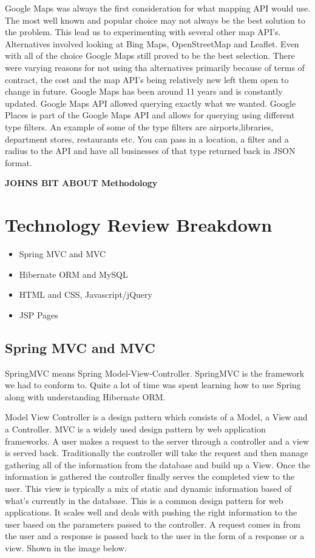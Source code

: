 Google Maps was always the first consideration for what mapping API would use. The most well known and popular choice may not always be the best solution to the problem. This lead us to experimenting with several other map API's. Alternatives involved looking at Bing Maps, OpenStreetMap and Leaflet. Even with all of the choice Google Maps still proved to be the best selection. There were varying reasons for not using tha alternatives primarily because of terms of contract, the cost and the map API's being relatively new left them open to change in future. Google Maps has been around 11 years and is constantly updated. Google Maps API allowed querying exactly what we wanted. Google Places is part of the Google Maps API and allows for querying using different type filters. An example of some of the type filters are airports,libraries, department stores, restaurants etc. You can pass in a location, a filter and a radius to the API and have all businesses of that type returned back in JSON format. \newline

\textbf{JOHNS BIT ABOUT Methodology}

\chapter{Technology Review Breakdown}

\begin{itemize}	
	\item Spring MVC and MVC	
	\item Hibernate ORM and MySQL
	\item HTML and CSS, Javascript/jQuery
	\item JSP Pages
\end{itemize}

\section{Spring MVC and MVC}

SpringMVC means Spring Model-View-Controller. SpringMVC is the framework we had to conform to. Quite a lot of time was spent learning how to use Spring along with understanding Hibernate ORM.

Model View Controller is a design pattern which consists of a Model, a View and a Controller. MVC is a widely used design pattern by web application frameworks. A user makes a request to the server through a controller and a view is served back. Traditionally the controller will take the request and then manage gathering all of the information from the database and build up a View. Once the information is gathered the controller finally serves the completed view to the user. This view is typically a mix of static and dynamic information based of what's currently in the database. This is a common design pattern for web applications. It scales well and deals with pushing the right information to the user based on the parameters passed to the controller. A request comes in from the user and a response is passed back to the user in the form of a response or a view. Shown in the image below.

